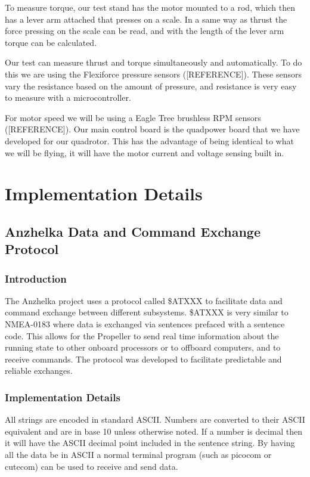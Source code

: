 \documentclass{article}
\numberwithin{equation}{section} %
\begin{document}
To measure torque, our test stand has the motor mounted to a rod, which then has a lever arm attached that presses on a scale. In a same way as thrust the force pressing on the scale can be read, and with the length of the lever arm torque can be calculated.

Our test can measure thrust and torque simultaneously and automatically. To do this we are using the Flexiforce pressure sensors ([REFERENCE]). These sensors vary the resistance based on the amount of pressure, and resistance is very easy to measure with a microcontroller.

For motor speed we will be using a Eagle Tree brushless RPM sensors ([REFERENCE]). Our main control board is the quadpower board that we have developed for our quadrotor. This has the advantage of being identical to what we will be flying, it will have the motor current and voltage sensing built in.



\section{Implementation Details}

\subsection{Anzhelka Data and Command Exchange Protocol}

\subsubsection{Introduction}
The Anzhelka project uses a protocol called \$ATXXX to facilitate data and command exchange between different subsystems. \$ATXXX is very similar to NMEA-0183 where data is exchanged via sentences prefaced with a sentence code. This allows for the Propeller to send real time information about the running state to other onboard processors or to offboard computers, and to receive commands. The protocol was developed to facilitate predictable and reliable exchanges.

\subsubsection{Implementation Details}
All strings are encoded in standard ASCII. Numbers are converted to their ASCII equivalent and are in base 10 unless otherwise noted. If a number is decimal then it will have the ASCII decimal point included in the sentence string. By having all the data be in ASCII a normal terminal program (such as picocom or cutecom) can be used to receive and send data. 
\end{document}
